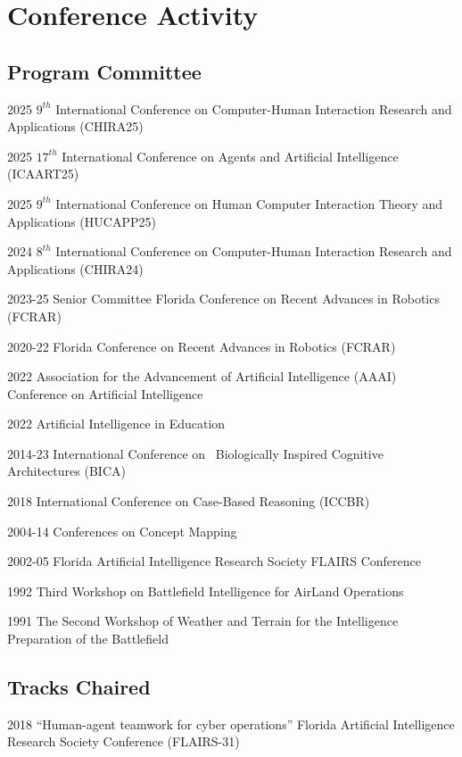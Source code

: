 \documentclass[12pt,letterpaper]{report}
\begin{document}
    \section*{Conference Activity}

    \subsection*{Program Committee}
    \begin{tablist}
        \item[2025] \tab{}$9^{th}$ International Conference on Computer-Human Interaction Research and Applications (CHIRA25)
        \item[2025] \tab{}$17^{th}$ International Conference on Agents and Artificial Intelligence (ICAART25)
        \item[2025] \tab{}$9^{th}$ International Conference on Human Computer Interaction Theory and Applications (HUCAPP25)
        \item[2024] \tab{}$8^{th}$ International Conference on Computer-Human Interaction Research and Applications (CHIRA24)
        \item[2023-25] \tab{}Senior Committee Florida Conference on Recent Advances in Robotics (FCRAR)
        \item[2020-22] \tab{}Florida Conference on Recent Advances in Robotics (FCRAR)
        \item[2022] \tab{}Association for the Advancement of Artificial Intelligence (AAAI) Conference on Artificial Intelligence
        \item[2022] \tab{}Artificial Intelligence in Education
        \item[2014-23] \tab{}International Conference on  Biologically Inspired Cognitive Architectures (BICA)
        \item[2018] \tab{}International Conference on Case-Based Reasoning (ICCBR)
        \item[2004-14] \tab{}Conferences on Concept Mapping 
        \item[2002-05] \tab{}Florida Artificial Intelligence Research Society FLAIRS Conference
        \item[1992] \tab{}Third Workshop on Battlefield Intelligence for AirLand Operations
        \item[1991] \tab{}The Second Workshop of Weather and Terrain for the Intelligence Preparation of the Battlefield
    \end{tablist}

    \subsection*{Tracks Chaired}
    \begin{tablist}
        \item[2018] \tab{}\enquote{Human-agent teamwork for cyber operations} Florida Artificial Intelligence Research Society Conference (FLAIRS-31)
    \end{tablist}
\end{document}
